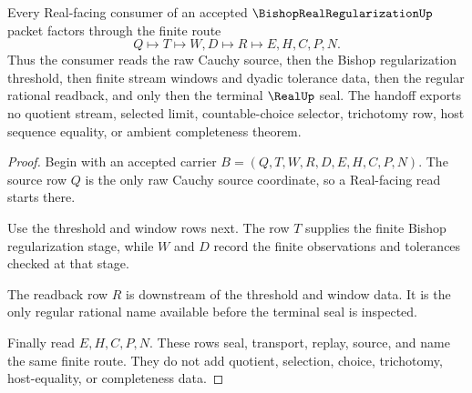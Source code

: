 \begin{theorem}
\label{thm:bishop-real-regularization-real-seal-handoff}
Every Real-facing consumer of an accepted $\BishopRealRegularizationUp$ packet factors through the finite route
$$
Q \longmapsto T \longmapsto W,D \longmapsto R \longmapsto E,H,C,P,N .
$$
Thus the consumer reads the raw Cauchy source, then the Bishop regularization threshold, then finite stream windows and dyadic tolerance data, then the regular rational readback, and only then the terminal $\RealUp$ seal. The handoff exports no quotient stream, selected limit, countable-choice selector, trichotomy row, host sequence equality, or ambient completeness theorem.
\end{theorem}
\begin{proof}
Begin with an accepted carrier $B=(Q,T,W,R,D,E,H,C,P,N)$. The source row $Q$ is the only raw Cauchy source coordinate, so a Real-facing read starts there.

Use the threshold and window rows next. The row $T$ supplies the finite Bishop regularization stage, while $W$ and $D$ record the finite observations and tolerances checked at that stage.

The readback row $R$ is downstream of the threshold and window data. It is the only regular rational name available before the terminal seal is inspected.

Finally read $E,H,C,P,N$. These rows seal, transport, replay, source, and name the same finite route. They do not add quotient, selection, choice, trichotomy, host-equality, or completeness data.
\end{proof}

